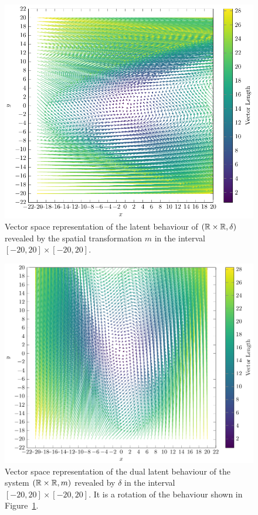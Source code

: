 \begin{figure}[t]
    \centering
    \includegraphics[width=\textwidth]{Figures/VectorSpace4.pdf} 
    \caption{Vector space representation of the latent behaviour of $(\mathbb{R}\times\mathbb{R}, \delta)$ revealed by the spatial transformation $m$ in the interval $[-20,20]\times[-20,20]$.}
    \label{fig:FirstLatent}
\end{figure} 

\begin{figure}[t]
    \includegraphics[width=\textwidth]{Figures/VectorSpace3.pdf} 
    \caption{Vector space representation of the dual latent behaviour of the system $(\mathbb{R}\times\mathbb{R}, m)$ revealed by $\delta$ in the interval $[-20,20]\times[-20,20]$. It is a rotation of the behaviour shown in Figure~\ref{fig:FirstLatent}.}
    \label{fig:SecondLatent} 
  \end{figure}

